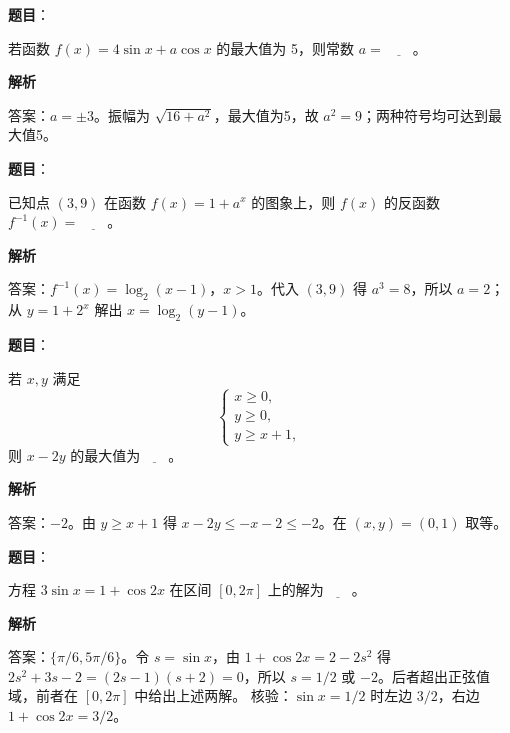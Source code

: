 \begin{answer}

\textbf{题目}：

若函数 \(f(x)=4\sin x+a\cos x\) 的最大值为 5，则常数 \(a=\)\(\underline{\qquad}\)。

\textbf{解析}

答案：\(a=\pm3\)。振幅为 \(\sqrt{16+a^2}\)，最大值为5，故 \(a^2=9\)；两种符号均可达到最大值5。


\end{answer}
\begin{answer}

\textbf{题目}：

已知点 \((3,9)\) 在函数 \(f(x)=1+a^x\) 的图象上，则 \(f(x)\) 的反函数 \(f^{-1}(x)=\)\(\underline{\qquad}\)。

\textbf{解析}

答案：\(f^{-1}(x)=\log_2(x-1)\)，\(x>1\)。代入 \((3,9)\) 得 \(a^3=8\)，所以 \(a=2\)；从 \(y=1+2^x\) 解出 \(x=\log_2(y-1)\)。


\end{answer}
\begin{answer}

\textbf{题目}：

若 \(x,y\) 满足
\nopagebreak[4]
\[
\begin{cases}
x\geqslant0,\\
y\geqslant0,\\
y\geqslant x+1,
\end{cases}
\]
则 \(x-2y\) 的最大值为\(\underline{\qquad}\)。

\textbf{解析}

答案：\(-2\)。由 \(y\ge x+1\) 得 \(x-2y\le-x-2\le-2\)。在 \((x,y)=(0,1)\) 取等。


\end{answer}
\begin{answer}

\textbf{题目}：

方程 \(3\sin x=1+\cos2x\) 在区间 \([0,2\pi]\) 上的解为\(\underline{\qquad}\)。

\textbf{解析}

答案：\(\{\pi/6,5\pi/6\}\)。令 \(s=\sin x\)，由 \(1+\cos2x=2-2s^2\) 得 \(2s^2+3s-2=(2s-1)(s+2)=0\)，所以 \(s=1/2\) 或 \(-2\)。后者超出正弦值域，前者在 \([0,2\pi]\) 中给出上述两解。
核验：\(\sin x=1/2\) 时左边 \(3/2\)，右边 \(1+\cos2x=3/2\)。


\end{answer}
